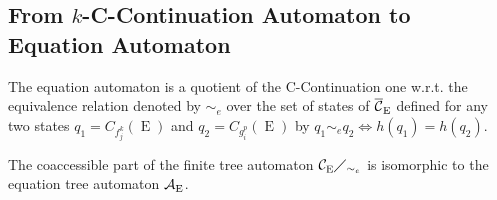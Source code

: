 \documentclass{llncs}
\DeclareMathOperator{\E}{E}
\def\b#1{\overline{#1}}
\begin{document}
\subsection{From $k$-C-Continuation Automaton to Equation Automaton}

The equation automaton is a quotient of the C-Continuation one
w.r.t. the equivalence relation denoted by $\sim_e$ over the set of states of ${\cal \b C_{\E}}$ defined for any two states $q_1=C_{f^k_j}(\E)$ and $q_2=C_{g^p_i}(\E)$ by $q_1 \sim_e q_2 \Leftrightarrow h(q_1)=h(q_2)$.

\begin{proposition}\label{prop coacc part quot eq}
The coaccessible part of the finite tree automaton ${\cal C_{\E}}\diagup_{\sim_e}$ is isomorphic to the equation tree automaton ${\cal A_{\E}}$.
\end{proposition}
\end{document}
